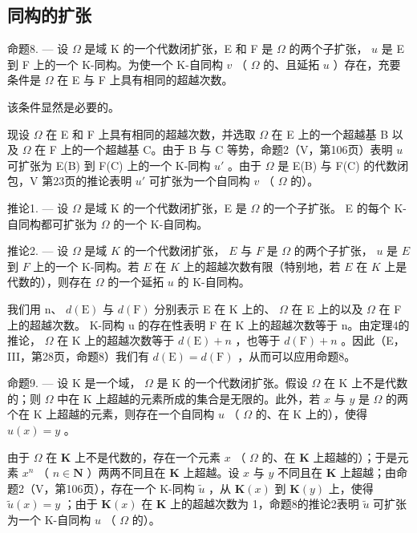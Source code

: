 \subsection{同构的扩张}

命题8. --- 设 \(\Omega\) 是域 K 的一个代数闭扩张，E 和 F 是 \(\Omega\) 的两个子扩张， \(u\) 是 E 到 F 上的一个 K-同构。为使一个 K-自同构 \(v\) （ \(\Omega\) 的、且延拓 \(u\) ）存在，充要条件是 \(\Omega\) 在 E 与 F 上具有相同的超越次数。

该条件显然是必要的。

现设 \(\Omega\) 在 E 和 F 上具有相同的超越次数，并选取 \(\Omega\) 在 E 上的一个超越基 B 以及 \(\Omega\) 在 F 上的一个超越基 C。由于 B 与 C 等势，命题2（V，第106页）表明 \(u\) 可扩张为 E(B) 到 F(C) 上的一个 K-同构 \(u'\) 。由于 \(\Omega\) 是 E(B) 与 F(C) 的代数闭包，V 第23页的推论表明 \(u'\) 可扩张为一个自同构 \(v\) （ \(\Omega\) 的）。

推论1. --- 设 \(\Omega\) 是域 K 的一个代数闭扩张，E 是 \(\Omega\) 的一个子扩张。 E 的每个 K-自同构都可扩张为 \(\Omega\) 的一个 K-自同构。

推论2. --- 设 \(\Omega\) 是域 \(K\) 的一个代数闭扩张， \(E\) 与 \(F\) 是 \(\Omega\) 的两个子扩张， \(u\) 是 \(E\) 到 \(F\) 上的一个 K-同构。若 \(E\) 在 \(K\) 上的超越次数有限（特别地，若 \(E\) 在 \(K\) 上是代数的），则存在 \(\Omega\) 的一个延拓 \(u\) 的 K-自同构。

我们用 n、 \(d(\mathrm{E})\) 与 \(d(\mathrm{F})\) 分别表示 E 在 K 上的、 \(\Omega\) 在 E 上的以及 \(\Omega\) 在 F 上的超越次数。 K-同构 u 的存在性表明 F 在 K 上的超越次数等于 n。由定理4的推论， \(\Omega\) 在 K 上的超越次数等于 \(d(\mathrm{E}) + n\) ，也等于 \(d(\mathrm{F}) + n\) 。因此（E，III，第28页，命题8）我们有 \(d(\mathrm{E}) = d(\mathrm{F})\) ，从而可以应用命题8。

命题9. --- 设 K 是一个域， \(\Omega\) 是 K 的一个代数闭扩张。假设 \(\Omega\) 在 K 上不是代数的；则 \(\Omega\) 中在 K 上超越的元素所成的集合是无限的。此外，若 \(x\) 与 \(y\) 是 \(\Omega\) 的两个在 K 上超越的元素，则存在一个自同构 \(u\) （ \(\Omega\) 的、在 K 上的），使得 \(u(x) = y\) 。

由于 \(\Omega\) 在 \(\mathbf{K}\) 上不是代数的，存在一个元素 \(x\) （ \(\Omega\) 的、在 \(\mathbf{K}\) 上超越的）；于是元素 \(x^n\) （ \(n \in \mathbf{N}\) ）两两不同且在 \(\mathbf{K}\) 上超越。设 \(x\) 与 \(y\) 不同且在 \(\mathbf{K}\) 上超越；由命题2（V，第106页），存在一个 K-同构 \(\tilde{u}\) ，从 \(\mathbf{K}(x)\) 到 \(\mathbf{K}(y)\) 上，使得 \(\tilde{u}(x) = y\) ；由于 \(\mathbf{K}(x)\) 在 \(\mathbf{K}\) 上的超越次数为 1，命题8的推论2表明 \(\tilde{u}\) 可扩张为一个 K-自同构 \(u\) （ \(\Omega\) 的）。

